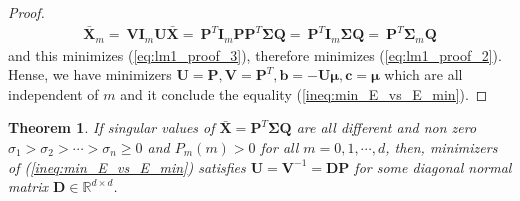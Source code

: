 \documentclass{article}
\newtheorem{theorem}{Theorem}
\begin{document}
\begin{proof}
    \begin{align}
        \bar{\mathbf{X}}_m 
        = \ \mathbf{V} \mathbf{I}_m \mathbf{U} \bar{\mathbf{X}}
        = \ \mathbf{P}^T \mathbf{I}_m \mathbf{P} \mathbf{P}^T \mathbf{\Sigma} \mathbf{Q}
        = \ \mathbf{P}^T \mathbf{I}_m \mathbf{\Sigma} \mathbf{Q}
        = \ \mathbf{P}^T \mathbf{\Sigma}_m \mathbf{Q} \nonumber
    \end{align}
    and this minimizes (\ref{eq:lm1_proof_3}), therefore minimizes (\ref{eq:lm1_proof_2}). Hense, we have minimizers $\mathbf{U} = \mathbf{P}, \mathbf{V} = \mathbf{P}^T, \mathbf{b} = -\mathbf{U}\mathbf{\mu}, \mathbf{c} = \mathbf{\mu}$ which are all independent of $m$ and it conclude the equality (\ref{ineq:min_E_vs_E_min}).
    \end{proof}
    
    \begin{theorem}
      \label{th:svd}
      If singular values of $\bar{\mathbf{X}} = \mathbf{P}^T \mathbf{\Sigma} \mathbf{Q}$ are all different and non zero $\sigma_1 > \sigma_2 > \cdots > \sigma_n \geq 0$ and $P_m(m) > 0$ for all $m = 0, 1, \cdots, d$, then, minimizers of (\ref{ineq:min_E_vs_E_min}) satisfies $\mathbf{U} = \mathbf{V}^{-1} = \mathbf{D} \mathbf{P}$ for some diagonal normal matrix $\mathbf{D} \in \mathbb{R}^{d \times d}$.
    \end{theorem}
\end{document}
